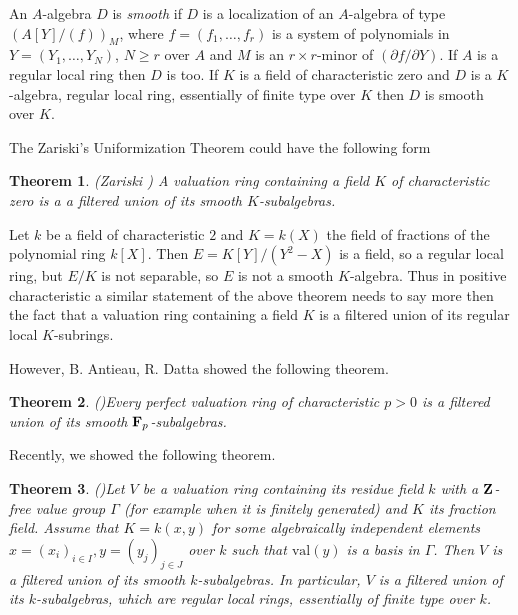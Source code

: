 \documentclass[12pt]{amsart}
\newtheorem{Theorem}{Theorem}[]
\theoremstyle{definition}
\theoremstyle{subsection-tweak}
\theoremstyle{theorem}
\theoremstyle{definition}
\newcommand{\val}{\mathrm{val}}		%
\begin{document}
     An  $A$-algebra $D$ is  {\em
smooth} if $D$ is a localization of an $A$-algebra of type  $(A[Y]/(f))_M$, where  $f=(f_1,\ldots ,f_r) $  is a system of polynomials
in  $Y=(Y_1,\ldots,Y_N)$, $N\geq r$ over  $A$ and  $M$ is an $r\times r$-minor of $(\partial f/\partial Y)$. If $A$ is a regular local ring then $D$ is too. If $K$ is a field of characteristic   zero and $D$ is a $K$-algebra, regular local ring, essentially of finite type over $K$ then $D$ is smooth over $K$. 

The Zariski's Uniformization Theorem could have the following form
     
  
\begin{Theorem} \label{T1}  (Zariski \cite{Z}) A valuation ring containing a field $K$ of characteristic zero is a    a filtered union of its smooth $K$-subalgebras.
\end{Theorem}  
   
   
   Let $k$ be a field of characteristic $2$ and $K=k(X)$ the field of fractions of the polynomial ring $k[X]$. Then $E=K[Y]/(Y^2-X)$ is a field, so a regular local ring,
   but $E/K$ is not separable, so $ E $ is not a smooth $K$-algebra. Thus in positive characteristic a similar statement of the above theorem needs to say more then the fact that a valuation ring containing a field $K$ is a filtered union of its regular local $K$-subrings.
   
 However, B. Antieau, R. Datta \cite[Theorem 4.1.1]{AD} showed the following theorem. 
\begin{Theorem} (\cite{AD})\label{T2}
  Every perfect valuation ring of characteristic $p>0$ is a filtered union of its smooth ${\bf F}_p$-subalgebras. 
 \end{Theorem}
 
 Recently, we showed the following theorem.
 
   \begin{Theorem}(\cite[Corollary 5]{P3})\label{T3} Let $V$ be a  valuation ring containing its residue field $k$   with a $\bf Z$-free value group $\Gamma$ (for example when it is finitely generated) and $K$ its fraction field. Assume that  $K=k(x,y)$ for some  algebraically independent elements $x=(x_i)_{i\in I},y=(y_j)_{j\in J}$ over $k$ such that $\val(y)$ is a basis in $\Gamma$. 
 Then $V$ is a filtered  union of its smooth $k$-subalgebras. In particular, $V$ is a filtered  union of its  $k$-subalgebras, which are regular local rings, essentially of finite type over $k$.
\end{Theorem}
\end{document}
